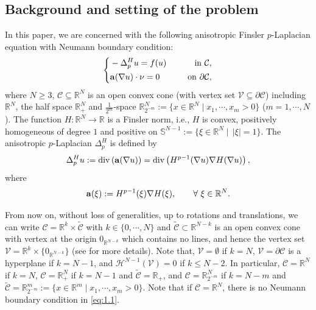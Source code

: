 \documentclass[12pt]{amsart}
\theoremstyle{definition}
\theoremstyle{remark}
\theoremstyle{conclusion}
\theoremstyle{conjecture}
\numberwithin{equation}{section}
\begin{document}
\subsection{Background and setting of the problem}
In this paper, we are concerned with the following anisotropic Finsler $p$-Laplacian equation with Neumann boundary condition:
    \begin{equation}\label{eq:1.1}
      \left\{
          \begin{aligned}
          &-\Delta ^{H}_{p}u=f(u) \quad\,\,\, &{\rm{in}} \,\, \mathcal{C}, \\
          &{\bf{a}}(\nabla u)\cdot \nu =0 \quad\,\,\, &{\rm{on}} \,\, \partial\mathcal{C},
          \end{aligned}
          \right.
    \end{equation}
where $N\geq3$,  $\mathcal{C}\subseteq\mathbb{R}^{N}$ is an open convex cone (with vertex set $\mathcal{V}\subseteq\partial\mathcal{C}$) including $\mathbb{R}^{N}$, the half space $\mathbb{R}^{N}_{+}$ and $\frac{1}{2^{m}}$-space $\mathbb{R}^{N}_{2^{-m}}:=\{x\in\mathbb{R}^{N}\mid x_{1},\cdots,x_{m}>0\}$ ($m=1,\cdots,N$). The function $H:\mathbb{R}^N\rightarrow\mathbb{R}$ is a Finsler norm, i.e., $H$ is convex, positively homogeneous of degree $1$ and positive on $\mathbb{S}^{N-1}:=\{\xi\in\mathbb{R}^{N}\mid\,|\xi|=1\}$. The anisotropic $p$-Laplacian $\Delta ^{H}_{p}$ is defined by
\begin{equation*}\label{NL}
  \Delta ^{H}_{p}u:=\operatorname{div}\left({\bf{a}}(\nabla u)\right)=\operatorname{div}\left(H^{p-1}(\nabla u)\nabla H(\nabla u)\right),
\end{equation*}
where
\begin{equation*}\label{a}
  {\bf{a}}(\xi):=H^{p-1}(\xi)\nabla H(\xi), \qquad \forall \,\, \xi\in\mathbb{R}^{N}.
\end{equation*}

\medskip

From now on, without loss of generalities, up to rotations and translations, we can write $\mathcal{C}=\mathbb{R}^{k}\times\mathcal{\widetilde{C}}$ with $k\in\{0,\cdots ,N\}$ and $\mathcal{\widetilde{C}}\subset\mathbb{R}^{N-k}$ is an open convex cone with vertex at the origin $0_{\mathbb{R}^{N-k}}$ which contains no lines, and hence the vertex set $\mathcal{V}=\mathbb{R}^{k}\times\{0_{\mathbb{R}^{N-k}}\}$ (see \cite{DPV} for more details). Note that, $\mathcal{V}=\emptyset$ if $k=N$, $\mathcal{V}=\partial\mathcal{C}$ is a hyperplane if $k=N-1$, and $\mathcal{H}^{N-1}(\mathcal{V})=0$ if $k\leq N-2$. In particular, $\mathcal{C}=\mathbb{R}^{N}$ if $k=N$, $\mathcal{C}=\mathbb{R}^{N}_{+}$ if $k=N-1$ and $\mathcal{\widetilde{C}}=\mathbb{R}_{+}$, and $\mathcal{C}=\mathbb{R}^{N}_{2^{-m}}$ if $k=N-m$ and $\mathcal{\widetilde{C}}=\mathbb{R}^{m}_{2^{-m}}:=\{x\in\mathbb{R}^{m}\mid x_{1},\cdots,x_{m}>0\}$. Note that if $\mathcal{C}=\mathbb{R}^{N}$, there is no Neumann boundary condition in \eqref{eq:1.1}.
\end{document}
